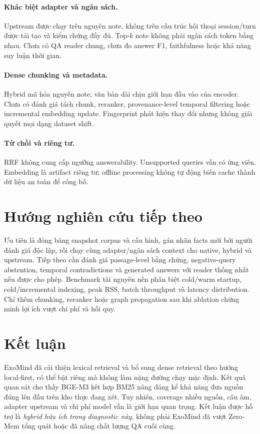 \documentclass[11pt,a4paper]{article}
\begin{document}
\paragraph{Khác biệt adapter và ngân sách.} Upstream được chạy trên nguyên note, không trên cấu trúc hội thoại session/turn được tái tạo và kiểm chứng đầy đủ. Top-$k$ note không phải ngân sách token bằng nhau. Chưa có QA reader chung, chưa đo answer F1, faithfulness hoặc khả năng suy luận thời gian.

\paragraph{Dense chunking và metadata.} Hybrid mã hóa nguyên note; văn bản dài chịu giới hạn đầu vào của encoder. Chưa có đánh giá tách chunk, reranker, provenance-level temporal filtering hoặc incremental embedding update. Fingerprint phát hiện thay đổi nhưng không giải quyết mọi dạng dataset shift.

\paragraph{Từ chối và riêng tư.} RRF không cung cấp ngưỡng answerability. Unsupported queries vẫn có ứng viên. Embedding là artifact riêng tư; offline processing không tự động biến cache thành dữ liệu an toàn để công bố.

\section{Hướng nghiên cứu tiếp theo}
Ưu tiên là đóng băng snapshot corpus và cấu hình, gán nhãn facts mới bởi người đánh giá độc lập, rồi chạy cùng adapter/ngân sách context cho native, hybrid và upstream. Tiếp theo cần đánh giá passage-level bằng chứng, negative-query abstention, temporal contradictions và generated answers với reader thống nhất nếu được cho phép. Benchmark tài nguyên nên phân biệt cold/warm startup, cold/incremental indexing, peak RSS, batch throughput và latency distribution. Chỉ thêm chunking, reranker hoặc graph propagation sau khi ablation chứng minh lợi ích vượt chi phí và hồi quy.

\section{Kết luận}
ExoMind đã cải thiện lexical retrieval và bổ sung dense retrieval theo hướng local-first, có thể bật riêng mà không làm nặng đường chạy mặc định. Kết quả quan sát cho thấy BGE-M3 kết hợp BM25 nâng đáng kể khả năng đưa nguồn đúng lên đầu trên kho thực đang xét. Tuy nhiên, coverage nhiều nguồn, câu âm, adapter upstream và chi phí model vẫn là giới hạn quan trọng. Kết luận được hỗ trợ là \emph{hybrid hữu ích trong diagnostic này}, không phải ExoMind đã vượt Zero-Mem tổng quát hoặc đã nâng chất lượng QA cuối cùng.
\end{document}
